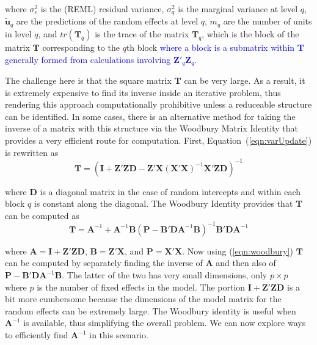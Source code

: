 \documentclass[12pt]{article}
\begin{document}
\noindent where $\sigma_{e}^2$ is the (REML) residual variance, $\sigma^2_{q}$ is the marginal variance at level $q$, $\widetilde{\bm{u}}_q$ are the predictions of the random effects at level $q$, $m_q$ are the number of units in level $q$, and $tr(\bm{T}_q)$ is the trace of the matrix $\bm{T}_q$, which is the block of the matrix $\bm{T}$ corresponding to the $q$th block \textcolor{blue}{where a block is a submatrix within $\bm{T}$ generally formed from calculations involving $\bm{Z}'_q\bm{Z}_q$}. 

The challenge here is that the square matrix $\bm{T}$ can be very large. As a result, it is extremely expensive to find its inverse inside an iterative problem, thus rendering this approach computationally prohibitive unless a reduceable structure can be identified. In some cases, there is an alternative method for taking the inverse of a matrix with this structure via the Woodbury Matrix Identity \cite{Woodbury1950} that provides a very efficient route for computation. First, Equation~(\ref{eqn:varUpdate}) is rewritten as
\begin{equation}
	\label{eqn:varStep1}
	\bm{T} = \left(\bm{I} +  \bm{Z}'\bm{Z}\bm{D} - \bm{Z}'\bm{X} (\bm{X}'\bm{X})^{-1} \bm{X}'\bm{Z}\bm{D}\right)^{-1}
\end{equation}

\noindent where $\bm{D}$ is a diagonal matrix in the case of random intercepts and within each block $q$ is constant along the diagonal. The Woodbury Identity provides that $\bm{T}$ can be computed as
\begin{equation}
	\label{eqn:woodbury}
	\bm{T} = \bm{A}^{-1} + \bm{A}^{-1}\bm{B}\left(\bm{P} - \bm{B}'\bm{D}\bm{A}^{-1}\bm{B}\right)^{-1}\bm{B}'\bm{D}\bm{A}^{-1}
\end{equation}

\noindent where $\bm{A} = \bm{I} +  \bm{Z}'\bm{Z}\bm{D}$, $\bm{B} = \bm{Z}'\bm{X}$, and $\bm{P} = \bm{X}'\bm{X}$. Now using (\ref{eqn:woodbury}) $\bm{T}$ can be computed by separately finding the inverse of $\bm{A}$ and then also of $\bm{P} - \bm{B}'\bm{D}\bm{A}^{-1}\bm{B}$. The latter of the two has very small dimensions, only $p \times p$ where $p$ is the number of fixed effects in the model. The portion $\bm{I} + \bm{Z}'\bm{Z}\bm{D}$ is a bit more cumbersome because the dimensions of the model matrix for the random effects can be extremely large. The Woodbury identity is useful when $\bm{A}^{-1}$ is available, thus simplifying the overall problem. We can now explore ways to efficiently find $\bm{A}^{-1}$ in this scenario.
\end{document}
